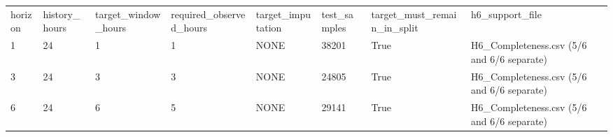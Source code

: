 \begin{longtable}{llllllll}
horizon & history\_hours & target\_window\_hours & required\_observed\_hours & target\_imputation & test\_samples & target\_must\_remain\_in\_split & h6\_support\_file \\
1 & 24 & 1 & 1 & NONE & 38201 & True & H6\_Completeness.csv (5/6 and 6/6 separate) \\
3 & 24 & 3 & 3 & NONE & 24805 & True & H6\_Completeness.csv (5/6 and 6/6 separate) \\
6 & 24 & 6 & 5 & NONE & 29141 & True & H6\_Completeness.csv (5/6 and 6/6 separate) \\
\end{longtable}
